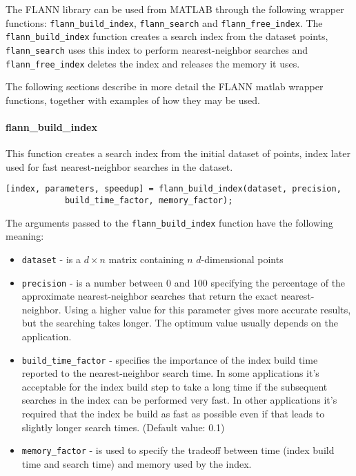 \documentclass[letter,10pt]{article}
\begin{document}
The FLANN library can be used from MATLAB through the following wrapper functions: \texttt{flann\_build\_index}, \texttt{flann\_search} and \texttt{flann\_free\_index}. The \texttt{flann\_build\_index} function creates a search index from the dataset points, \texttt{flann\_search} uses this index to perform nearest-neighbor searches and \texttt{flann\_free\_index} deletes the index and releases the memory it uses.

The following sections describe in more detail the FLANN matlab wrapper functions, together with examples of how they may be used.

\paragraph{flann\_build\_index} 

This function creates a search index from the initial dataset of points, index later used for fast nearest-neighbor searches in the dataset.

\begin{Verbatim}
[index, parameters, speedup] = flann_build_index(dataset, precision, 
			build_time_factor, memory_factor);
\end{Verbatim}

The arguments passed to the \texttt{flann\_build\_index} function have the following meaning:
\begin{itemize}

\item \texttt{dataset} - is a $d \times n$ matrix containing $n$ $d$-dimensional points

\item \texttt{precision} - is a number between 0 and 100 specifying the percentage of the approximate nearest-neighbor searches that return the exact nearest-neighbor. Using a higher value for this parameter gives more accurate results, but the searching takes longer. The optimum value usually depends on the application.

\item \texttt{build\_time\_factor} - specifies the importance of the index build time reported to the nearest-neighbor search time. In some applications it's acceptable for the index build step to take a long time if the subsequent searches in the index can be performed very fast. In other applications it's required that the index be build as fast as possible even if that leads to slightly longer search times. (Default value: 0.1)

\item \texttt{memory\_factor} - is used to specify the tradeoff between time (index build time and search time) and memory used by the index.
\end{itemize}
\end{document}
